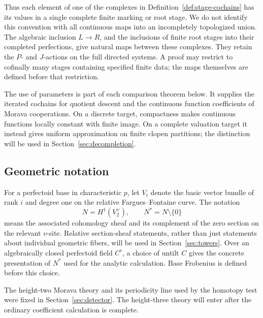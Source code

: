 Thus each element of one of the complexes in
Definition~\ref{def:stage-cochains} has its values in a single complete
finite marking or root stage. We do not identify this convention
with all continuous maps into an incompletely topologized union.
The algebraic inclusion \(L\to R\), and the inclusions of finite
root stages into their completed perfections, give natural maps
between these complexes. They retain the \(P\)- and \(J\)-actions
on the full directed systems. A proof may restrict to cofinally
many stages containing specified finite data; the maps themselves
are defined before that restriction.

The use of parameters is part of each comparison theorem below.
It supplies the iterated cochains for quotient descent and the
continuous function coefficients of Morava cooperations. On a
discrete target, compactness makes continuous functions locally
constant with finite image. On a complete valuation target it
instead gives uniform approximation on finite clopen partitions;
the distinction will be used in
Section~\ref{sec:decompletion}.

\subsection{Geometric notation}

For a perfectoid base in characteristic \(p\), let \(V_i\) denote
the basic vector bundle of rank \(i\) and degree one on the
relative Fargues--Fontaine curve. The notation
\[
                  N=H^1(V_2^\vee),\qquad N^*=N\setminus\{0\}
\]
means the associated cohomology sheaf and its complement of the
zero section on the relevant \(v\)-site.
Relative section-sheaf statements, rather than just statements
about individual geometric fibers, will be used in
Section~\ref{sec:towers}. Over an algebraically closed perfectoid
field \(C^\flat\), a choice of untilt \(C\) gives the concrete
presentation of \(N^*\) used for the analytic calculation.
Base Frobenius is defined before this choice.

The height-two Morava theory and its periodicity line used by the homotopy
test were fixed in Section~\ref{sec:detector}. The height-three theory
will enter after the ordinary coefficient calculation is complete.
